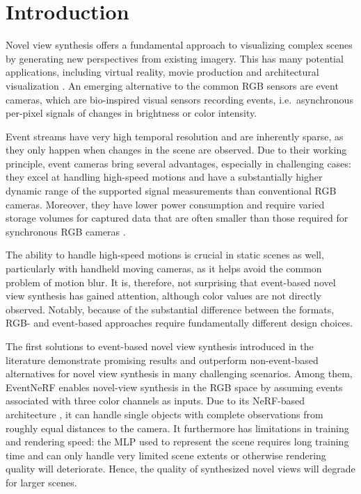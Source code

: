 \section{Introduction}\label{sec:Intro} 


Novel view synthesis offers a fundamental approach to visualizing complex scenes by generating new perspectives from existing imagery. 
This has many potential applications, including virtual reality, movie production and architectural visualization \cite{Tewari2022NeuRendSTAR}. 
An emerging alternative to the common RGB sensors are event cameras, which are  
 bio-inspired visual sensors recording events, i.e.~asynchronous per-pixel signals of changes in brightness or color intensity. 

Event streams have very high temporal resolution and are inherently sparse, as they only happen when changes in the scene are observed. 
Due to their working principle, event cameras bring several advantages, especially in challenging cases: they excel at handling high-speed motions 
and have a substantially higher dynamic range of the supported signal measurements than conventional RGB cameras. 
Moreover, they have lower power consumption and require varied storage volumes for captured data that are often smaller than those required for synchronous RGB cameras \cite{Millerdurai_3DV2024, Gallego2022}. 

The ability to handle high-speed motions is crucial in static scenes as well,  particularly with handheld moving cameras, as it helps avoid the common problem of motion blur. It is, therefore, not surprising that event-based novel view synthesis has gained attention, although color values are not directly observed.
Notably, because of the substantial difference between the formats, RGB- and event-based approaches require fundamentally different design choices. %

The first solutions to event-based novel view synthesis introduced in the literature demonstrate promising results \cite{eventnerf, enerf} and outperform non-event-based alternatives for novel view synthesis in many challenging scenarios. 
Among them, EventNeRF \cite{eventnerf} enables novel-view synthesis in the RGB space by assuming events associated with three color channels as inputs. 
Due to its NeRF-based architecture \cite{nerf}, it can handle single objects with complete observations from roughly equal distances to the camera. 
It furthermore has limitations in training and rendering speed: 
the MLP used to represent the scene requires long training time and can only handle very limited scene extents or otherwise rendering quality will deteriorate. 
Hence, the quality of synthesized novel views will degrade for larger scenes. %

